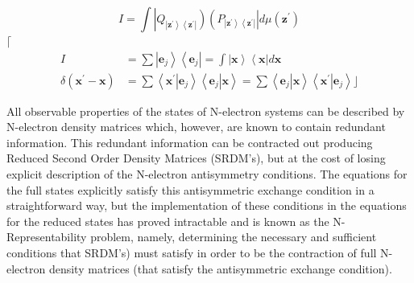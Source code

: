 \documentclass[aps,preprint]{revtex4}%
\begin{document}
\begin{equation}
I=\int\left\vert Q_{\left\vert \mathbf{z}^{\prime}\right\rangle \left\langle
\mathbf{z}^{\prime}\right\vert }\right)  \left(  P_{\left\vert \mathbf{z}%
^{\prime}\right\rangle \left\langle \mathbf{z}^{\prime}\right\vert
}\right\vert d\mu\left(  \mathbf{z}^{\prime}\right)
\end{equation}
$\lceil$%
\begin{align}
I  &  =\sum\left\vert \mathbf{e}_{j}\right\rangle \left\langle \mathbf{e}%
_{j}\right\vert =\int\left\vert \mathbf{x}\right\rangle \left\langle
\mathbf{x}\right\vert d\mathbf{x}\\
\delta\left(  \mathbf{x}^{\prime}-\mathbf{x}\right)   &  =\sum\left\langle
\left.  \mathbf{x}^{\prime}\right\vert \mathbf{e}_{j}\right\rangle
\left\langle \left.  \mathbf{e}_{j}\right\vert \mathbf{x}\right\rangle
=\sum\left\langle \left.  \mathbf{e}_{j}\right\vert \mathbf{x}\right\rangle
\left\langle \left.  \mathbf{x}^{\prime}\right\vert \mathbf{e}_{j}%
\right\rangle \rfloor
\end{align}


All observable properties of the states of N-electron systems can be described
by N-electron density matrices which, however, are known to contain redundant
information. This redundant information can be contracted out producing
Reduced Second Order Density Matrices (SRDM's), but at the cost of losing
explicit description of the N-electron antisymmetry conditions. The equations
for the full states explicitly satisfy this antisymmetric exchange condition
in a straightforward way, but the implementation of these conditions in the
equations for the reduced states has proved intractable and is known as the
N-Representability problem, namely, determining the necessary and sufficient
conditions that SRDM's) must satisfy in order to be the contraction of full
N-electron density matrices (that satisfy the antisymmetric exchange condition).

\section{}
\end{document}
